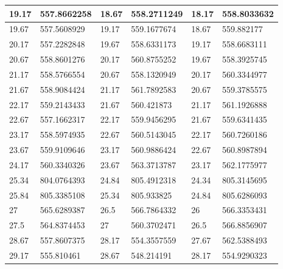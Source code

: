 \documentclass[11pt, letterpaper]{article}
\begin{document}
\begin{appendices}
\begin{table}[!ht]
\begin{tabular}{|l|l|l|l|l|l|}
        19.17 & 557.8662258 & 18.67 & 558.2711249 & 18.17 & 558.8033632 \\ \hline
        19.67 & 557.5608929 & 19.17 & 559.1677674 & 18.67 & 559.882177 \\ \hline
        20.17 & 557.2282848 & 19.67 & 558.6331173 & 19.17 & 558.6683111 \\ \hline
        20.67 & 558.8601276 & 20.17 & 560.8755252 & 19.67 & 558.3925745 \\ \hline
        21.17 & 558.5766554 & 20.67 & 558.1320949 & 20.17 & 560.3344977 \\ \hline
        21.67 & 558.9084424 & 21.17 & 561.7892583 & 20.67 & 559.3785575 \\ \hline
        22.17 & 559.2143433 & 21.67 & 560.421873 & 21.17 & 561.1926888 \\ \hline
        22.67 & 557.1662317 & 22.17 & 559.9456295 & 21.67 & 559.6341435 \\ \hline
        23.17 & 558.5974935 & 22.67 & 560.5143045 & 22.17 & 560.7260186 \\ \hline
        23.67 & 559.9109646 & 23.17 & 560.9886424 & 22.67 & 560.8987894 \\ \hline
        24.17 & 560.3340326 & 23.67 & 563.3713787 & 23.17 & 562.1775977 \\ \hline
        25.34 & 804.0764393 & 24.84 & 805.4912318 & 24.34 & 805.3145695 \\ \hline
        25.84 & 805.3385108 & 25.34 & 805.933825 & 24.84 & 805.6286093 \\ \hline
        27 & 565.6289387 & 26.5 & 566.7864332 & 26 & 566.3353431 \\ \hline
        27.5 & 564.8374453 & 27 & 560.3702471 & 26.5 & 566.8856907 \\ \hline
        28.67 & 557.8607375 & 28.17 & 554.3557559 & 27.67 & 562.5388493 \\ \hline
        29.17 & 555.810461 & 28.67 & 548.214191 & 28.17 & 554.9290323 \\ \hline
    \end{tabular}
\end{table}


\end{appendices}
\end{document}
